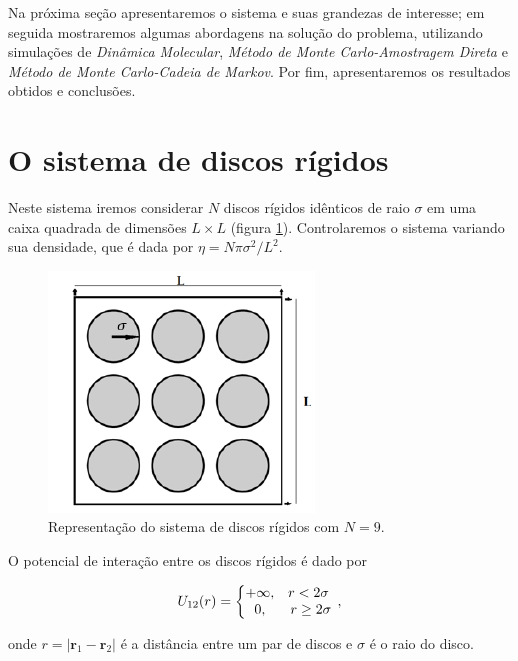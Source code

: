\documentclass[%
reprint,
amsmath,amssymb,
aps,
12pt
]{revtex4-1}
\begin{document}
Na próxima seção apresentaremos o sistema e suas grandezas de interesse; em seguida mostraremos algumas abordagens na solução do problema, utilizando simulações de \textit{Dinâmica Molecular}, \textit{Método de  Monte Carlo-Amostragem Direta} e \textit{Método de  Monte Carlo-Cadeia de Markov}. Por fim, apresentaremos os resultados obtidos e conclusões.

\section{O sistema de discos rígidos}
 Neste sistema iremos considerar $ N $ discos rígidos idênticos de raio  $ \sigma $  em uma caixa quadrada de dimensões $ L \times L $ (figura \ref{sistema}). Controlaremos o sistema variando sua densidade, que é dada por $ \eta = N \pi {\sigma}^2/L^2 $.
 
 \begin{figure}[!h]
 	\centering
 	\includegraphics[scale=0.5]{sistema.png}
 	\caption{Representação do sistema de discos rígidos com  $ N = 9 $.
 		\label{sistema}}
 \end{figure}
 
 O potencial de interação entre os discos rígidos é dado por
 
 
\begin{equation}
U_{12}(r) = \left \{ \begin{matrix} + \infty, & \mbox{$ r < 2\sigma $  } \\ 0, & \mbox{$ r \geq 2\sigma $} \end{matrix} \right.,
\end{equation}

onde $ r = |\textbf{r}_1 - \textbf{r}_2|$  é a distância entre um par de discos e $ \sigma $ é o raio do disco.

 
\end{document}
